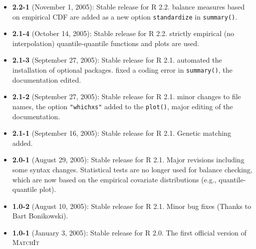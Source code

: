\documentclass[oneside,letterpaper,12pt]{book}
\newcommand{\MatchIt}{\textsc{MatchIt}}
\begin{document}
\begin{itemize}
\item \textbf{2.2-1} (November 1, 2005): Stable release for R 2.2.
  balance measures based on empirical CDF are added as a new option
  {\tt standardize} in {\tt summary()}.
\item \textbf{2.1-4} (October 14, 2005): Stable release for R 2.2.
  strictly empirical (no interpolation) quantile-quantile functions
  and plots are used.
\item \textbf{2.1-3} (September 27, 2005): Stable release for R 2.1.
  automated the installation of optional packages. fixed a coding
  error in {\tt summary()}, the documentation edited.
\item \textbf{2.1-2} (September 27, 2005): Stable release for R 2.1.
  minor changes to file names, the option {\tt "whichxs"} added to the
  {\tt plot()}, major editing of the documentation.
\item \textbf{2.1-1} (September 16, 2005): Stable release for R
        2.1. Genetic matching added.    
\item \textbf{2.0-1} (August 29, 2005): Stable release for R 2.1.
  Major revisions including some syntax changes. Statistical tests are
  no longer used for balance checking, which are now based on the
  empirical covariate distributions (e.g., quantile-quantile plot).
\item \textbf{1.0-2} (August 10, 2005): Stable release for R
  2.1. Minor bug fixes (Thanks to Bart Bonikowski).
\item \textbf{1.0-1} (January 3, 2005): Stable release for R 2.0. The
  first official version of \MatchIt
\end{itemize}



\clearpage



\end{document}
